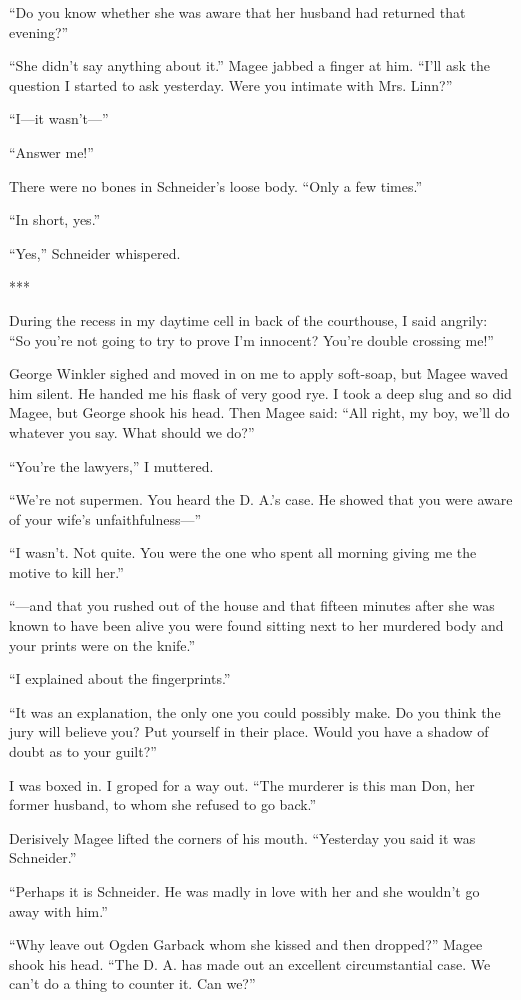\documentclass{novel}
\begin{document}
“Do you know whether she was aware that her husband had returned that evening?”

“She didn’t say anything about it.” Magee jabbed a finger at him. “I’ll ask the question I started to ask yesterday. Were you intimate with Mrs. Linn?”

“I—it wasn’t—”

“Answer me!”

There were no bones in Schneider’s loose body. “Only a few times.”

“In short, yes.”

“Yes,” Schneider whispered.

***

During the recess in my daytime cell in back of the courthouse, I said angrily: “So you’re not going to try to prove I’m innocent? You’re double crossing me!”

George Winkler sighed and moved in on me to apply soft-soap, but Magee waved him silent. He handed me his flask of very good rye. I took a deep slug and so did Magee, but George shook his head. Then Magee said: “All right, my boy, we’ll do whatever you say. What should we do?”

“You’re the lawyers,” I muttered.

“We’re not supermen. You heard the D. A.’s case. He showed that you were aware of your wife’s unfaithfulness—”

“I wasn’t. Not quite. You were the one who spent all morning giving me the motive to kill her.”

“—and that you rushed out of the house and that fifteen minutes after she was known to have been alive you were found sitting next to her murdered body and your prints were on the knife.”

“I explained about the fingerprints.”

“It was an explanation, the only one you could possibly make. Do you think the jury will believe you? Put yourself in their place. Would you have a shadow of doubt as to your guilt?”

I was boxed in. I groped for a way out. “The murderer is this man Don, her former husband, to whom she refused to go back.”

Derisively Magee lifted the corners of his mouth. “Yesterday you said it was Schneider.”

“Perhaps it is Schneider. He was madly in love with her and she wouldn’t go away with him.”

“Why leave out Ogden Garback whom she kissed and then dropped?” Magee shook his head. “The D. A. has made out an excellent circumstantial case. We can’t do a thing to counter it. Can we?”
\end{document}
